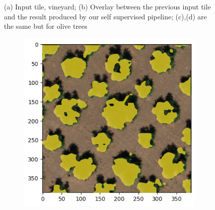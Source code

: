 \documentclass[comsoc,final]{IEEEtran}
\begin{document}
\begin{figure}
\begin{subfigure}[b]{0.45\columnwidth}
         \caption{}
         \label{maskplot:patch_inf2}
     \end{subfigure}%
%        
     \caption{(a) Input tile, vineyard; (b) Overlay between the previous input tile and the result produced by our self supervised pipeline; 
     (c),(d) are the same but for olive trees}
\end{figure}

\begin{figure}{\centering%
%
      \begin{subfigure}[b]{0.3\columnwidth}
         \centering
         \includegraphics[width=\columnwidth]{ULIVO0INF}
         \caption{}
     \end{subfigure}%
%
     \begin{subfigure}[b]{0.3\columnwidth}
         \centering

\end{subfigure}}
\end{figure}
\end{document}
